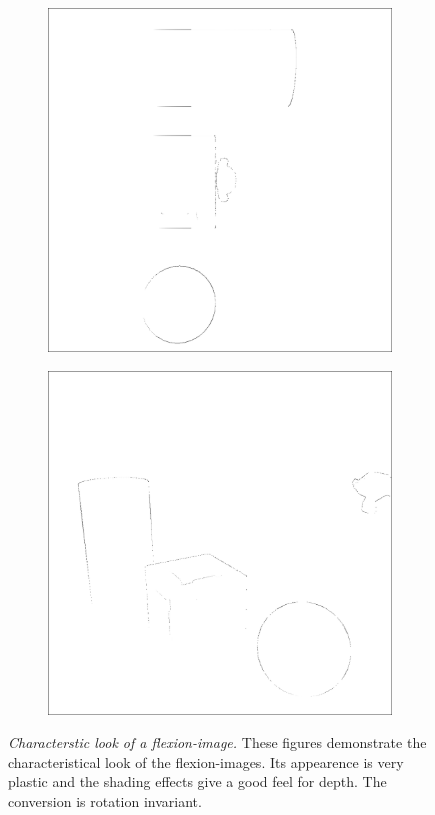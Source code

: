 \begin{figure}[H]
\begin{subfigure}[t]{0.32\textwidth}
        \includegraphics[width=\linewidth]{chapter04/img/flexion-0030.png}
    \end{subfigure}
    \begin{subfigure}[t]{0.32\textwidth}
        \includegraphics[width=\linewidth]{chapter04/img/flexion-0210.png}
    \end{subfigure}
    \caption[Characterstic look of a \gls{flexion-image}]{\emph{Characterstic look of a \gls{flexion-image}.} These figures demonstrate the characteristical look of the \Glspl{flexion-image}. Its appearence is very plastic and the shading effects give a good feel for depth. The conversion is rotation invariant.}\label{fig:flexion_images}
\end{figure}

